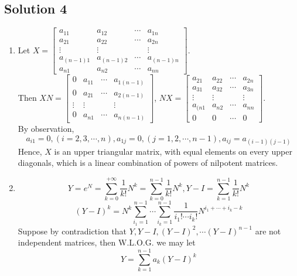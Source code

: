 \documentclass{article}
\begin{document}
\subsection*{Solution 4}
\begin{enumerate}
    \item Let $X=
    \left[\begin{array}{cccc} 
    a_{11} & a_{12} & \cdots & a_{1n} \\ 
    a_{21} &  a_{22} & \cdots & a_{2n} \\
    \vdots & \vdots & & \vdots \\
    a_{(n-1)1} &  a_{(n-1)2} & \cdots & a_{(n-1)n} \\
    a_{n1} & a_{n2} & \cdots & a_{nn}
    \end{array}\right]
    $. \\
    Then $XN = 
    \left[\begin{array}{cccc} 
    0 & a_{11} & \cdots & a_{1(n-1)} \\ 
    0 & a_{21} & \cdots & a_{2(n-1)} \\
    \vdots & \vdots & & \vdots \\
    0 & a_{n1} & \cdots & a_{n(n-1)}
    \end{array}\right]
    $, 
    $NX = 
    \left[\begin{array}{cccc} 
    a_{21} & a_{22} & \cdots & a_{2n} \\ 
    a_{31} & a_{32} & \cdots & a_{3n} \\
    \vdots & \vdots & & \vdots \\
    a_{(n1} &  a_{n2} & \cdots & a_{nn} \\
    0 & 0 & \cdots & 0
    \end{array}\right]
    $. \\
    By observation, 
    \[a_{i1} = 0, (i = 2, 3, \cdots, n), a_{1j} = 0, (j = 1, 2,\cdots, n - 1), a_{ij} = a_{(i - 1)(j - 1)}\]
    Hence, $X$ is an upper triangular matrix, with equal elements on every upper diagonals, which is a linear combination of powers of nilpotent matrices.
    \item
    \[Y = e ^ N =\sum_{k = 0} ^ {+\infty} \frac{1}{k!}N^k = \sum_{k = 0} ^ {n - 1} \frac{1}{k!} N ^ k, Y - I = \sum_{k = 1} ^ {n - 1} \frac{1}{k!} N ^ k\]
    \[(Y-I) ^ k = N ^ k \sum _{i_1 = 1} ^ {n - 1}\cdots \sum_{i_k = 1} ^ {n - 1} \frac{1}{i_1!\cdots i_k!}N ^ {i_1+\cdots+i_k - k}\]
    Suppose by contradiction that $Y, Y - I, (Y - I) ^ 2, \cdots (Y - I)^{n - 1}$ are not independent matrices, then W.L.O.G. we may let
    \[Y = \sum_{k = 1} ^ {n - 1} a_k (Y - I) ^ k\]

\end{enumerate}
\end{document}
